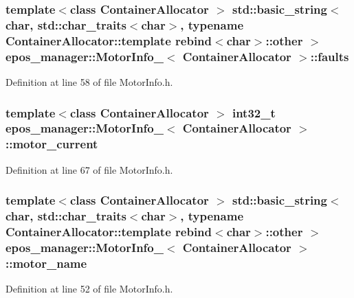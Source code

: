 \subsubsection[{faults}]{\setlength{\rightskip}{0pt plus 5cm}template$<$class Container\-Allocator $>$ std\-::basic\-\_\-string$<$char, std\-::char\-\_\-traits$<$char$>$, typename \-Container\-Allocator\-::template rebind$<$char$>$\-::other $>$ {\bf epos\-\_\-manager\-::\-Motor\-Info\-\_\-}$<$ \-Container\-Allocator $>$\-::{\bf faults}}\label{structepos__manager_1_1MotorInfo___aa640db9a40cf4c822ff8b9216fb2f22b}


\-Definition at line 58 of file \-Motor\-Info.\-h.

\subsubsection[{motor\-\_\-current}]{\setlength{\rightskip}{0pt plus 5cm}template$<$class Container\-Allocator $>$ int32\-\_\-t {\bf epos\-\_\-manager\-::\-Motor\-Info\-\_\-}$<$ \-Container\-Allocator $>$\-::{\bf motor\-\_\-current}}\label{structepos__manager_1_1MotorInfo___a85898e79fb769c0b16a571f0908d9bfd}


\-Definition at line 67 of file \-Motor\-Info.\-h.

\subsubsection[{motor\-\_\-name}]{\setlength{\rightskip}{0pt plus 5cm}template$<$class Container\-Allocator $>$ std\-::basic\-\_\-string$<$char, std\-::char\-\_\-traits$<$char$>$, typename \-Container\-Allocator\-::template rebind$<$char$>$\-::other $>$ {\bf epos\-\_\-manager\-::\-Motor\-Info\-\_\-}$<$ \-Container\-Allocator $>$\-::{\bf motor\-\_\-name}}\label{structepos__manager_1_1MotorInfo___a03c91963a4279131442b3caaf60bc835}


\-Definition at line 52 of file \-Motor\-Info.\-h.


